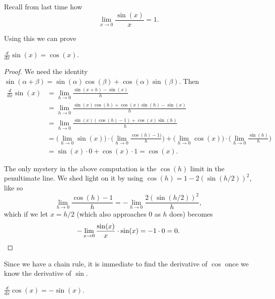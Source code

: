 
Recall from last time how
\[
	\lim_{x \to 0} \frac{\sin(x)}{x} = 1.
\]

\noindent
Using this we can prove

\begin{proposition}
	$\displaystyle \frac{d}{d x} \sin(x) = \cos(x)$.
\end{proposition}

\begin{proof}
	We need the identity $\sin(\alpha + \beta) = \sin(\alpha) \cos(\beta) + \cos(\alpha) \sin(\beta)$. Then
	\begin{align*}
		\frac{d}{d x} \sin(x) & = \lim_{h \to 0} \frac{\sin(x + h) - \sin(x)}{h}                                                                                                                                             \\
		                      & = \lim_{h \to 0} \frac{\sin(x) \cos(h) + \cos(x) \sin(h) - \sin(x)}{h}                                                                                                                       \\
		                      & = \lim_{h \to 0} \frac{\sin(x) (\cos(h) - 1) + \cos(x) \sin(h)}{h}                                                                                                                           \\
		                      & = \Big ( \lim_{h \to 0} \sin(x) \Big ) \cdot \Big ( \lim_{h \to 0} \frac{\cos(h) - 1)}{h} \Big ) + \Big ( \lim_{h \to 0} \cos(x) \Big ) \cdot \Big ( \lim_{h \to 0} \frac{\sin(h)}{h} \Big ) \\
		                      & = \sin(x) \cdot 0 + \cos(x) \cdot 1 = \cos(x).
	\end{align*}

	\noindent
	The only mystery in the above computation is the $\cos(h)$ limit in the penultimate line. We shed light on it by using $\cos(h) = 1 - 2 (\sin(h / 2))^2$, like so
	\[
		\lim_{h \to 0} \frac{\cos(h) - 1}{h} = - \lim_{h \to 0} \frac{2 (\sin(h / 2))^2}{h},
	\]
	which if we let $x = h / 2$ (which also approaches $0$ as $h$ does) becomes
	\[
		- \lim_{x \to 0} \frac{\sin(x)}{x} \cdot \sin(x) = -1 \cdot 0 = 0. \qedhere
	\]
\end{proof}

\noindent
Since we have a chain rule, it is immediate to find the derivative of $\cos$ once we know the derivative of $\sin$.

\begin{corollary}
	$\displaystyle \frac{d}{d x} \cos(x) = - \sin(x)$.
\end{corollary}

